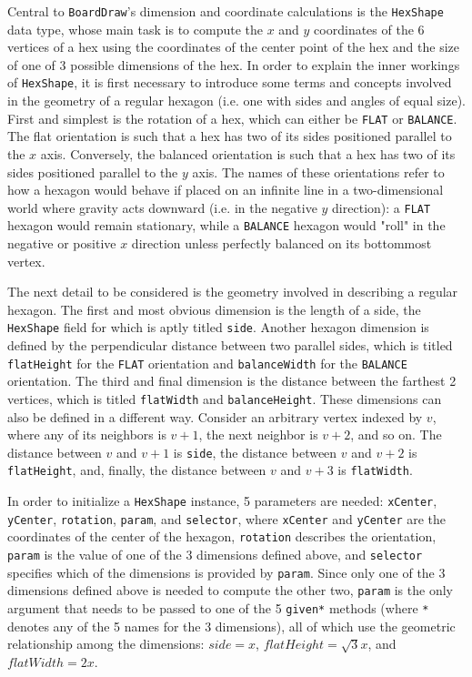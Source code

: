 \documentclass[pageno]{jpaper}
\begin{document}
\begin{doublespacing}
Central to \lstinline$BoardDraw$'s dimension and coordinate calculations is the \lstinline$HexShape$ data type, whose main task is to compute the $x$ and $y$ coordinates of the 6 vertices of a hex using the coordinates of the center point of the hex and the size of one of 3 possible dimensions of the hex. In order to explain the inner workings of \lstinline$HexShape$, it is first necessary to introduce some terms and concepts involved in the geometry of a regular hexagon (i.e. one with sides and angles of equal size). First and simplest is the rotation of a hex, which can either be \lstinline$FLAT$ or \lstinline$BALANCE$. The flat orientation is such that a hex has two of its sides positioned parallel to the $x$ axis. Conversely, the balanced orientation is such that a hex has two of its sides positioned parallel to the $y$ axis. The names of these orientations refer to how a hexagon would behave if placed on an infinite line in a two-dimensional world where gravity acts downward (i.e. in the negative $y$ direction): a \lstinline$FLAT$ hexagon would remain stationary, while a \lstinline$BALANCE$ hexagon would "roll" in the negative or positive $x$ direction unless perfectly balanced on its bottommost vertex.

The next detail to be considered is the geometry involved in describing a regular hexagon. The first and most obvious dimension is the length of a side, the \lstinline$HexShape$ field for which is aptly titled \lstinline$side$. Another hexagon dimension is defined by the perpendicular distance between two parallel sides, which is titled \lstinline$flatHeight$ for the \lstinline$FLAT$ orientation and \lstinline$balanceWidth$ for the \lstinline$BALANCE$ orientation. The third and final dimension is the distance between the farthest 2 vertices, which is titled \lstinline$flatWidth$ and \lstinline$balanceHeight$. These dimensions can also be defined in a different way. Consider an arbitrary vertex indexed by $v$, where any of its neighbors is $v + 1$, the next neighbor is $v + 2$, and so on. The distance between $v$ and $v + 1$ is \lstinline$side$, the distance between $v$ and $v + 2$ is \lstinline$flatHeight$, and, finally, the distance between $v$ and $v + 3$ is \lstinline$flatWidth$. 

In order to initialize a \lstinline$HexShape$ instance, 5 parameters are needed: \lstinline$xCenter$, \lstinline$yCenter$, \lstinline$rotation$, \lstinline$param$, and \lstinline$selector$, where \lstinline$xCenter$ and \lstinline$yCenter$ are the coordinates of the center of the hexagon, \lstinline$rotation$ describes the orientation, \lstinline$param$ is the value of one of the 3 dimensions defined above, and \lstinline$selector$ specifies which of the dimensions is provided by \lstinline$param$. Since only one of the 3 dimensions defined above is needed to compute the other two, \lstinline$param$ is the only argument that needs to be passed to one of the 5 \lstinline$given*$ methods (where \lstinline$*$ denotes any of the 5 names for the 3 dimensions), all of which use the geometric relationship among the dimensions: $side = x$, $flatHeight = \sqrt{3}x$, and $flatWidth = 2x$.


\end{doublespacing}
\end{document}
